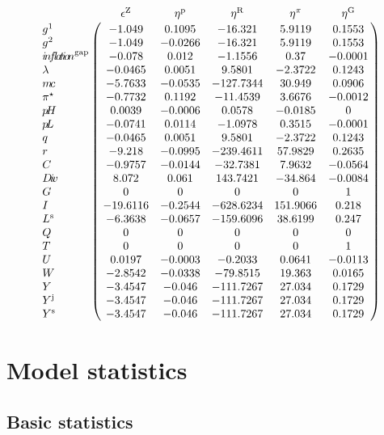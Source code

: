 $$\bordermatrix{
~ & \epsilon^{\mathrm{Z}} & \eta^{\mathrm{p}} & \eta^{\mathrm{R}} & \eta^{\pi} & \eta^{\mathrm{G}} \cr
g^{\mathrm{1}} & -1.049 & 0.1095 & -16.321 & 5.9119 & 0.1553 \cr
g^{\mathrm{2}} & -1.049 & -0.0266 & -16.321 & 5.9119 & 0.1553 \cr
{i\!n\!f\!l\!a\!t\!i\!o\!n}^{\mathrm{gap}} & -0.078 & 0.012 & -1.1556 & 0.37 & -0.0001 \cr
\lambda & -0.0465 & 0.0051 & 9.5801 & -2.3722 & 0.1243 \cr
{m\!c} & -5.7633 & -0.0535 & -127.7344 & 30.949 & 0.0906 \cr
\pi^{\star} & -0.7732 & 0.1192 & -11.4539 & 3.6676 & -0.0012 \cr
{p\!H} & 0.0039 & -0.0006 & 0.0578 & -0.0185 & 0 \cr
{p\!L} & -0.0741 & 0.0114 & -1.0978 & 0.3515 & -0.0001 \cr
q & -0.0465 & 0.0051 & 9.5801 & -2.3722 & 0.1243 \cr
r & -9.218 & -0.0995 & -239.4611 & 57.9829 & 0.2635 \cr
C & -0.9757 & -0.0144 & -32.7381 & 7.9632 & -0.0564 \cr
{D\!i\!v} & 8.072 & 0.061 & 143.7421 & -34.864 & -0.0084 \cr
G & 0 & 0 & 0 & 0 & 1 \cr
I & -19.6116 & -0.2544 & -628.6234 & 151.9066 & 0.218 \cr
L^{\mathrm{s}} & -6.3638 & -0.0657 & -159.6096 & 38.6199 & 0.247 \cr
Q & 0 & 0 & 0 & 0 & 0 \cr
T & 0 & 0 & 0 & 0 & 1 \cr
U & 0.0197 & -0.0003 & -0.2033 & 0.0641 & -0.0113 \cr
W & -2.8542 & -0.0338 & -79.8515 & 19.363 & 0.0165 \cr
Y & -3.4547 & -0.046 & -111.7267 & 27.034 & 0.1729 \cr
Y^{\mathrm{j}} & -3.4547 & -0.046 & -111.7267 & 27.034 & 0.1729 \cr
Y^{\mathrm{s}} & -3.4547 & -0.046 & -111.7267 & 27.034 & 0.1729 \cr
}$$


\section{Model statistics}

\subsection{Basic statistics}

